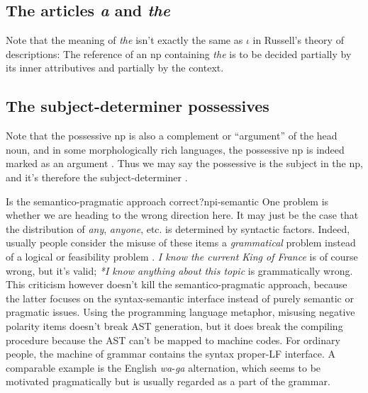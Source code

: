 \documentclass[UTF8, a4paper, oneside, scheme=plain]{ctexrep}
\newcommand*{\citesec}[1]{\S~{#1}}
\newcommand*{\citepage}[1]{pp.~{#1}}
\newcommand{\corpus}[1]{\emph{#1}}
\begin{document}
\subsection{The articles \corpus{a} and \corpus{the}}

Note that the meaning of \corpus{the} isn't exactly the same as $\iota$ in 
Russell's theory of descriptions:
The reference of an \acs{np} containing \corpus{the} is 
to be decided partially by its inner attributives and partially by the context.

\subsection{The subject-determiner possessives}

Note that the possessive \acs{np} is also a complement or ``argument''
of the head noun,
and in some morphologically rich languages,
the possessive \acs{np} is indeed marked as an argument 
\citep[\citesec{5.1.2.1}]{jacques2021grammar}.
Thus we may say the possessive is the subject in the \acs{np},
and it's therefore the subject-determiner \citep[\citepage{467}]{cgel}.

\begin{theorybox}{Is the semantico-pragmatic approach correct?}{npi-semantic}
    One problem is whether we are heading to the wrong direction here.
    It may just be the case that the distribution of \corpus{any}, \corpus{anyone}, etc. 
    is determined by syntactic factors.
    Indeed, usually people consider the misuse of these items 
    a \emph{grammatical} problem 
    instead of a logical or feasibility problem
    \citep[\citepage{812}]{zeijlstra2013}.
    \corpus{I know the current King of France} is of course wrong,
    but it's valid;
    \corpus{*I know anything about this topic} is grammatically wrong.
    This criticism however doesn't kill the semantico-pragmatic approach,
    because the latter focuses on the syntax-semantic interface 
    instead of purely semantic or pragmatic issues.
    Using the programming language metaphor,
    misusing negative polarity items doesn't break AST generation,
    but it does break the compiling procedure
    because the AST can't be mapped to machine codes.
    For ordinary people, the machine of grammar contains the syntax proper-LF interface.
    A comparable example is the English \corpus{wa}-\corpus{ga} alternation,
    which seems to be motivated pragmatically 
    but is usually regarded as a part of the grammar.
\end{theorybox}
\end{document}
